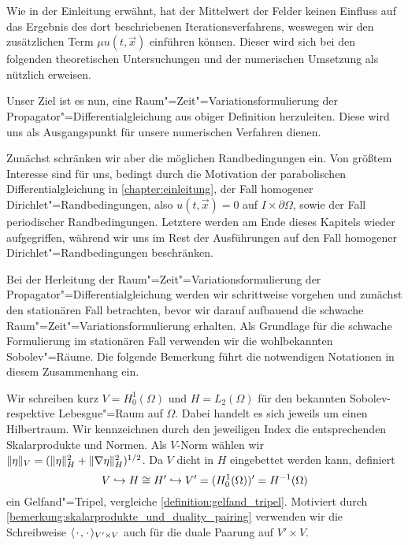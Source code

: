 \documentclass[../main.tex]{subfiles}
\begin{document}
Wie in der Einleitung erwähnt, hat der Mittelwert der Felder keinen Einfluss auf das Ergebnis des dort beschriebenen Iterationsverfahrens, weswegen wir den zusätzlichen Term $\mu u(t, \vec{x})$ einführen können.
Dieser wird sich bei den folgenden theoretischen Untersuchungen und der numerischen Umsetzung als nützlich erweisen.

Unser Ziel ist es nun, eine Raum"=Zeit"=Variationsformulierung der Propagator"=Differentialgleichung aus obiger Definition herzuleiten.
Diese wird uns als Ausgangspunkt für unsere numerischen Verfahren dienen.

Zunächst schränken wir aber die möglichen Randbedingungen ein.
Von größtem Interesse sind für uns, bedingt durch die Motivation der parabolischen Differentialgleichung in \cref{chapter:einleitung}, der Fall homogener Dirichlet"=Randbedingungen, also $u(t, \vec{x}) = 0$ auf $I \times \partial \Omega$, sowie der Fall periodischer Randbedingungen.
Letztere werden am Ende dieses Kapitels wieder aufgegriffen, während wir uns im Rest der Ausführungen auf den Fall homogener Dirichlet"=Randbedingungen beschränken.

Bei der Herleitung der Raum"=Zeit"=Variationsformulierung der Propagator"=Differentialgleichung werden wir schrittweise vorgehen und zunächst den stationären Fall betrachten, bevor wir darauf aufbauend die schwache Raum"=Zeit"=Variationsformulierung erhalten.
Als Grundlage für die schwache Formulierung im stationären Fall verwenden wir die wohlbekannten Sobolev"=Räume.
Die folgende Bemerkung führt die notwendigen Notationen in diesem Zusammenhang ein.

\begin{Bemerkung}
\label{bemerkung:raeume_und_gelfand_tripel}
    Wir schreiben kurz $V = H^{1}_{0}(\Omega)$ und $H = L_{2}(\Omega)$ für den bekannten Sobolev- respektive Lebesgue"=Raum auf $\Omega$.
    Dabei handelt es sich jeweils um einen Hilbertraum.
    Wir kennzeichnen durch den jeweiligen Index die entsprechenden Skalarprodukte und Normen.
    Als $V$-Norm wählen wir $\lVert\eta\rVert_{V} = (\lVert\eta\rVert^{2}_{H} + \lVert\nabla \eta\rVert^{2}_{H})^{1/2}$.
    Da $V$ dicht in $H$ eingebettet werden kann, definiert
    \begin{equation}
        V \hookrightarrow H \cong H' \hookrightarrow V' = (H^{1}_{0}(\Omega))' = H^{-1}(\Omega)
    \end{equation}
    ein Gelfand"=Tripel, vergleiche \cref{definition:gelfand_tripel}.
    Motiviert durch \cref{bemerkung:skalarprodukte_und_duality_pairing} verwenden wir die Schreibweise $\langle{\mkern2mu\cdot\mkern2mu},{\mkern2mu\cdot\mkern2mu}\rangle_{V' \times V}$ auch für die duale Paarung auf $V' \times V$.
\end{Bemerkung}
\end{document}
